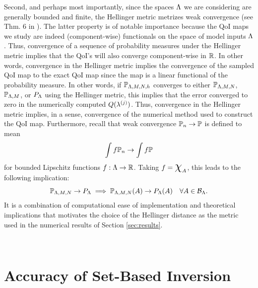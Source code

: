 Second, and perhaps most importantly, since the spaces ${\Lambda}$ we are considering are generally bounded and finite, the Hellinger metric metrizes weak convergence (see Thm. 6 in \cite{GS02}).
The latter property is of notable importance because the QoI maps we study are indeed (component-wise) functionals on the space of model inputs ${\Lambda}$.
Thus, convergence of a sequence of probability measures under the Hellinger metric implies that the QoI's will also converge component-wise in $\mathbb{R}$.
In other words, convergence in the Hellinger metric implies the convergence of the sampled QoI map to the exact QoI map since the map is a linear functional of the probability measure.
In other words, if $\mathbb{P}_{{\Lambda},M,N,h}$ converges to either $\mathbb{P}_{{\Lambda},M,N}$, $\mathbb{P}_{{\Lambda},M}$, or $P_{\Lambda}$ using the Hellinger metric, this implies that the error converged to zero in the numerically computed $Q(\lambda^{(j)})$.
Thus, convergence in the Hellinger metric implies, in a sense, convergence of the numerical method used to construct the QoI map.
Furthermore, recall that weak convergence $\mathbb{P}_n \to \mathbb{P}$ is defined to mean
\[
\int f \mathbb{P}_n \to \int f \mathbb{P}
\]
for bounded Lipschitz functions $f:{\Lambda}\to\mathbb{R}$.
Taking $f = \Chi_A$, this leads to the following implication:
\[
\mathbb{P}_{{\Lambda}, M, N} \to P_{\Lambda} \implies \mathbb{P}_{{\Lambda}, M, N} (A) \to P_{\Lambda} (A) \quad \forall{A\in\mathcal{B}_{{\Lambda}}}.
\]
It is a combination of computational ease of implementation and theoretical implications that motivates the choice of the Hellinger distance as the metric used in the numerical results of Section \ref{sec:results}.



\
\section{Accuracy of Set-Based Inversion}\label{sec:ch03-set}




